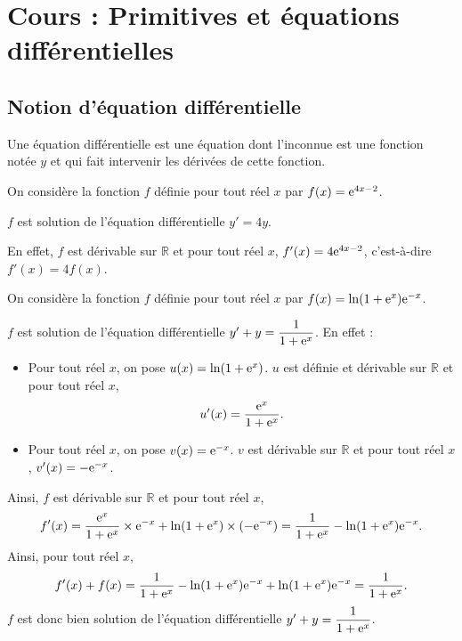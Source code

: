 \documentclass[11pt,fleqn, openany]{book} %
\begin{document}


\chapter{Cours : Primitives et équations différentielles}


\section{Notion d'équation différentielle}

\begin{definition}Une équation différentielle est une équation dont l'inconnue est une fonction notée $y$ et qui fait intervenir les dérivées de cette fonction.\end{definition}

\begin{example}On considère la fonction $f$ définie pour tout réel $x$ par $f(x)=\mathrm{e}^{4x-2}$. 

$f$ est solution de l'équation différentielle $y'=4y$. 

En effet, $f$ est dérivable sur $\mathbb{R}$ et pour tout réel $x$, $f'(x)=4\mathrm{e}^{4x-2}$, c'est-à-dire $f'(x)=4f(x)$.\end{example}

\begin{example}On considère la fonction $f$ définie pour tout réel $x$ par $f(x)=\ln(1+\mathrm{e}^x)\mathrm{e}^{-x}$. 

$f$ est solution de l'équation différentielle $y'+y=\dfrac{1}{1+\mathrm{e}^x}$. En effet :

\begin{itemize}
\item Pour tout réel $x$, on pose $u(x)=\ln(1+\mathrm{e}^x)$. $u$ est définie et dérivable sur $\mathbb{R}$ et pour tout réel $x$, \[u'(x)=\dfrac{\mathrm{e}^x}{1+\mathrm{e}^x}.\]
\item Pour tout réel $x$, on pose $v(x)=\mathrm{e}^{-x}$. $v$ est dérivable sur $\mathbb{R}$ et pour tout réel $x$, $v'(x)=-\mathrm{e}^{-x}$.
\end{itemize}
Ainsi, $f$ est dérivable sur $\mathbb{R}$ et pour tout réel $x$,
\[f'(x)=\dfrac{\mathrm{e}^x}{1+\mathrm{e}^x}\times \mathrm{e}^{-x}+\ln(1+\mathrm{e}^x)\times(-\mathrm{e}^{-x})=\dfrac{1}{1+\mathrm{e}^x}-\ln(1+\mathrm{e}^x)\mathrm{e}^{-x}.\]
Ainsi, pour tout réel $x$,
\[f'(x)+f(x)=\dfrac{1}{1+\mathrm{e}^x}-\ln(1+\mathrm{e}^x)\mathrm{e}^{-x}+\ln(1+\mathrm{e}^x)\mathrm{e}^{-x}=\dfrac{1}{1+\mathrm{e}^x}.\]
$f$ est donc bien solution de l'équation différentielle $y'+y=\dfrac{1}{1+\mathrm{e}^x}$.\end{example}
\end{document}
